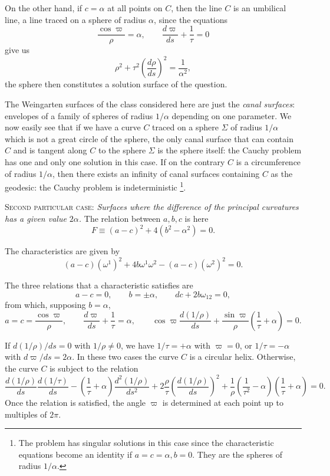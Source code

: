 \documentclass[leqno,11pt]{book}
\numberwithin{equation}{chapter}
\theoremstyle{shape1}
\theoremstyle{shape0}
\theoremstyle{shape2}
\theoremstyle{definition}
\begin{document}
On the other hand, if $c=\alpha$ at all points on $C$, then the line $C$ is an umbilical line, a line traced on a sphere of radius $\alpha$, since the equations
\[
\frac{\cos\varpi}{\rho}=\alpha,\qquad\frac{d\varpi}{ds}+\frac{1}{\tau}=0
\]
give us
\[
\rho^{2}+\tau^{2}\left(\frac{d\rho}{ds}\right)^{2}=\frac{1}{\alpha^{2}},
\]
the sphere then constitutes a solution surface of the question.

The Weingarten surfaces of the class considered here are just the \emph{canal surfaces}: envelopes of a family of spheres of radius $1/\alpha$ depending on one parameter. We now easily see that if we have a curve $C$ traced on a sphere $\Sigma$ of radius $1/\alpha$ which is not a great circle of the sphere, the only canal surface that can contain $C$ and is tangent along $C$ to the sphere $\Sigma$ is the sphere itself: the Cauchy problem has one and only one solution in this case. If on the contrary $C$ is a circumference of radius $1/\alpha$, then there exists an infinity of canal surfaces containing $C$ as the geodesic: the Cauchy problem is indeterministic \footnote{The problem has singular solutions in this case since the characteristic equations become an identity if $a=c=\alpha,b=0$. They are the spheres of radius $1/\alpha$.}.




\vspace{12pt}\fsec \textsc{Second particular case:} \emph{Surfaces where the difference of the principal curvatures has a given value $2\alpha$.} The relation between $a,b,c$ is here
\[
F\equiv(a-c)^{2}+4(b^{2}-\alpha^{2})=0.
\]

The characteristics are given by
\[
(a-c)(\omega^{1})^{2}+4b\omega^{1}\omega^{2}-(a-c)(\omega^{2})^{2}=0.
\]

The three relations that a characteristic satisfies are
\[
a-c=0,\qquad b=\pm\alpha,\qquad dc+2b\omega_{12}=0,
\]
from which, supposing $b=\alpha$,
\[
a=c=\frac{\cos\varpi}{\rho},\qquad\frac{d\varpi}{ds}+\frac{1}{\tau}=\alpha,\qquad \cos\varpi\frac{d(1/\rho)}{ds}+\frac{\sin\varpi}{\rho}\left(\frac{1}{\tau}+\alpha\right)=0.
\]

If $d(1/\rho)/ds=0$ with $1/\rho\neq 0$, we have $1/\tau=+\alpha$ with $\varpi =0$, or $1/\tau=-\alpha$ with $d\varpi/ds=2\alpha$. In these two cases the curve $C$ is a circular helix. Otherwise, the curve $C$ is subject to the relation
\[
\frac{d(1/\rho)}{ds}\frac{d(1/\tau)}{ds}-\left(\frac{1}{\tau}+\alpha\right)\frac{d^{2}(1/\rho)}{ds^{2}}+2\frac{\rho}{\tau}\left(\frac{d(1/\rho)}{ds}\right)^{2}+\frac{1}{\rho}\left(\frac{1}{\tau^{2}}-\alpha\right)\left(\frac{1}{\tau}+\alpha\right)=0.
\]
Once the relation is satisfied, the angle $\varpi$ is determined at each point up to multiples of $2\pi$.
\end{document}
